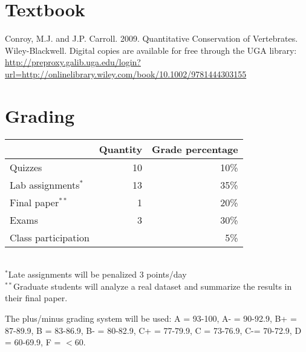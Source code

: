 \documentclass[12pt]{article}
\begin{document}
\vspace{-3mm}
\section*{\normalsize Textbook}
\vspace{-4mm}
Conroy, M.J. and J.P. Carroll. 2009. Quantitative Conservation of
Vertebrates. Wiley-Blackwell.
Digital copies are available for free through the UGA library:
{\footnotesize \url{http://preproxy.galib.uga.edu/login?url=http://onlinelibrary.wiley.com/book/10.1002/9781444303155}}

\vspace{-3mm}
\section*{\normalsize Grading}
\vspace{-4mm}
\begin{center}
  \begin{tabular}[h!]{lrr}
    \hline
                              & Quantity & Grade percentage      \\
    \hline
    Quizzes                   & 10       & 10\%                  \\
    Lab assignments$^*$       & 13       & 35\%                  \\
    Final paper$^{**}$         & 1        & 20\%                  \\
    Exams                     & 3        & 30\%                  \\
    Class participation       &          & 5\%                   \\
    \hline
  \end{tabular}                                                  \\
  \small
\hspace{0mm} $^*$Late assignments will be penalized 3 points/day \\ 
\hspace{0mm} $^{**}$Graduate students will analyze a real dataset and
summarize the results in their final paper.
\end{center}
\vspace{-6pt}
{%
The plus/minus grading system will be used: %
A = 93-100, A- =
90-92.9, B+ = 87-89.9, B = 83-86.9, B- = 80-82.9, C+ = 77-79.9, C =
73-76.9, C-= 70-72.9, D = 60-69.9, F = $<$60. 
}
\end{document}
